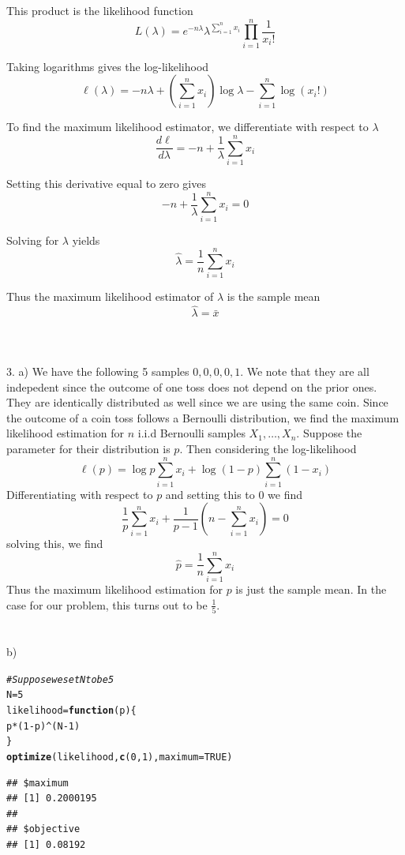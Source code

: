 \documentclass[11pt]{article}\usepackage[]{graphicx}\usepackage[]{xcolor}
\makeatletter
\newcommand{\hlnum}[1]{\textcolor[rgb]{0.686,0.059,0.569}{#1}}%
\newcommand{\hlcom}[1]{\textcolor[rgb]{0.678,0.584,0.686}{\textit{#1}}}%
\newcommand{\hlopt}[1]{\textcolor[rgb]{0,0,0}{#1}}%
\newcommand{\hldef}[1]{\textcolor[rgb]{0.345,0.345,0.345}{#1}}%
\newcommand{\hlkwa}[1]{\textcolor[rgb]{0.161,0.373,0.58}{\textbf{#1}}}%
\newcommand{\hlkwb}[1]{\textcolor[rgb]{0.69,0.353,0.396}{#1}}%
\newcommand{\hlkwc}[1]{\textcolor[rgb]{0.333,0.667,0.333}{#1}}%
\newcommand{\hlkwd}[1]{\textcolor[rgb]{0.737,0.353,0.396}{\textbf{#1}}}%
\newenvironment{kframe}{%
 \def\at@end@of@kframe{}%
 \ifinner\ifhmode%
  \def\at@end@of@kframe{\end{minipage}}%
  \begin{minipage}{\columnwidth}%
 \fi\fi%
 \def\FrameCommand##1{\hskip\@totalleftmargin \hskip-\fboxsep
 \colorbox{shadecolor}{##1}\hskip-\fboxsep
     \hskip-\linewidth \hskip-\@totalleftmargin \hskip\columnwidth}%
 \MakeFramed {\advance\hsize-\width
   \@totalleftmargin\z@ \linewidth\hsize
   \@setminipage}}%
 {\par\unskip\endMakeFramed%
 \at@end@of@kframe}
\newenvironment{knitrout}{}{} %
\makeatother
\begin{document}
This product is the likelihood function
\[
L(\lambda)
= e^{-n\lambda}\lambda^{\sum_{i=1}^n x_i}\prod_{i=1}^n \frac{1}{x_i!}
\]

Taking logarithms gives the log-likelihood
\[
\ell(\lambda)
= -n\lambda + \left(\sum_{i=1}^n x_i\right)\log\lambda
- \sum_{i=1}^n \log(x_i!)
\]

To find the maximum likelihood estimator, we differentiate with respect to $\lambda$
\[
\frac{d\ell}{d\lambda}
= -n + \frac{1}{\lambda}\sum_{i=1}^n x_i
\]

Setting this derivative equal to zero gives
\[
-n + \frac{1}{\lambda}\sum_{i=1}^n x_i = 0
\]

Solving for $\lambda$ yields
\[
\hat{\lambda} = \frac{1}{n}\sum_{i=1}^n x_i
\]

Thus the maximum likelihood estimator of $\lambda$ is the sample mean
\[
\hat{\lambda} = \bar{x}
\]
\\ \\ \\
3. a) We have the following 5 samples $0,0,0,0,1$. We note that they are all indepedent since the outcome of one toss does not depend on the prior ones. They are identically distributed as well since we are using the same coin. Since the outcome of a coin toss follows a Bernoulli distribution, we find the maximum likelihood estimation for $n$ i.i.d Bernoulli samples $X_1,\dots,X_n$. Suppose the parameter for their distribution is $p$. Then considering the log-likelihood
$$\ell(p)=\log{p}\sum_{i=1}^{n}x_i+\log{(1-p)}\sum_{i=1}^n (1-x_i)$$
Differentiating with respect to $p$ and setting this to 0 we find 
$$\frac{1}{p}\sum_{i=1}^n x_i+\frac{1}{p-1}\left(n-\sum_{i=1}^n x_i\right)=0$$
solving this, we find 
$$\hat{p}=\frac{1}{n}\sum_{i=1}^n x_i$$
Thus the maximum likelihood estimation for $p$ is just the sample mean. In the case for our problem, this turns out to be $\frac{1}{5}$.
\\ \\ \\
b)
\begin{knitrout}
\color{fgcolor}\begin{kframe}
\begin{alltt}
\hlcom{#Suppose we set N to be 5}
\hldef{N}\hlkwb{=}\hlnum{5}
\hldef{likelihood}\hlkwb{=}\hlkwa{function}\hldef{(}\hlkwc{p}\hldef{)\{}
  \hldef{p}\hlopt{*}\hldef{(}\hlnum{1}\hlopt{-}\hldef{p)}\hlopt{^}\hldef{(N}\hlopt{-}\hlnum{1}\hldef{)}
\hldef{\}}
\hlkwd{optimize}\hldef{(likelihood,}\hlkwd{c}\hldef{(}\hlnum{0}\hldef{,}\hlnum{1}\hldef{),}\hlkwc{maximum}\hldef{=}\hlnum{TRUE}\hldef{)}
\end{alltt}
\begin{verbatim}
## $maximum
## [1] 0.2000195
## 
## $objective
## [1] 0.08192
\end{verbatim}
\end{kframe}
\end{knitrout}
\end{document}
